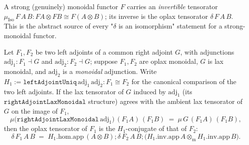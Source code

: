 \begin{lemma}
  \label{mk-lem:functor_monoidal_muiso}
  \mathlibok

  A strong (genuinely) monoidal functor \(F\) carries an \emph{invertible} tensorator
  \(\mu_{\mathrm{Iso}}\,F\,A\,B : F A \otimes F B \cong F(A \otimes B)\); its inverse is the oplax
  tensorator \(\delta\,F\,A\,B\). This is the abstract source of every "\(\delta\) is an
  isomorphism" statement for a strong-monoidal functor.
\end{lemma}

\begin{lemma}\label{mk-lem:deltaconjofmucomparison}
  \leanok

  Let \(F_1, F_2\) be two left adjoints of a common right adjoint \(G\), with adjunctions
  \(\mathrm{adj}_1 : F_1 \dashv G\) and \(\mathrm{adj}_2 : F_2 \dashv G\); suppose \(F_1, F_2\) are
  oplax monoidal, \(G\) is lax monoidal, and \(\mathrm{adj}_2\) is a \emph{monoidal} adjunction.
  Write \(H_1 := \mathtt{leftAdjointUniq}\,\mathrm{adj}_1\,\mathrm{adj}_2 : F_1 \cong F_2\) for the
  canonical comparison of the two left adjoints. If the lax tensorator of \(G\) induced by
  \(\mathrm{adj}_1\) (its \(\mathtt{rightAdjointLaxMonoidal}\) structure) agrees with the ambient
  lax tensorator of \(G\) on the image of \(F_1\),
  \[
    \mu\bigl(\mathtt{rightAdjointLaxMonoidal}\,\mathrm{adj}_1\bigr)\,(F_1 A)\,(F_1 B)
      \;=\; \mu\,G\,(F_1 A)\,(F_1 B),
  \]
  then the oplax tensorator of \(F_1\) is the \(H_1\)-conjugate of that of \(F_2\):
  \[
    \delta\,F_1\,A\,B
      \;=\; H_1.\mathrm{hom}.\mathrm{app}\,(A \otimes B)
        \mathbin{;} \delta\,F_2\,A\,B
        \mathbin{;} \bigl(H_1.\mathrm{inv}.\mathrm{app}\,A \otimes_{\mathrm m}
          H_1.\mathrm{inv}.\mathrm{app}\,B\bigr).
  \]
\end{lemma}
